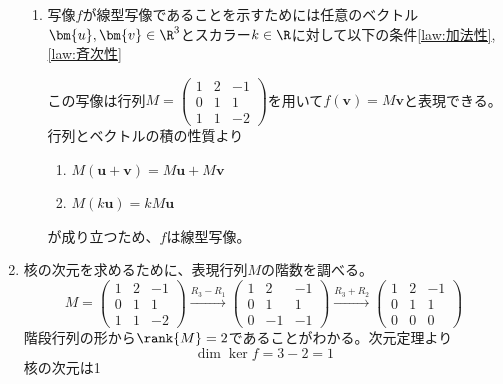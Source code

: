 \documentclass[dvipdfmx]{jsreport}
\begin{document}
\begin{souanswer}
\begin{enumerate}
\begin{enumerate_roman}
\end{enumerate_roman}
\begin{enumerate}
	\item 写像$f$が線型写像であることを示すためには任意のベクトル$\bm{u}, \bm{v}\in \R^3$とスカラー$k\in \R$に対して以下の条件\ref{law:加法性}, \ref{law:斉次性}
	この写像は行列$M= \begin{pmatrix}1& 2& -1\\ 0& 1& 1\\ 1& 1& -2\end{pmatrix}$を用いて$f(\bm{v})= M\bm{v}$と表現できる。行列とベクトルの積の性質より
\begin{enumerate}
	\item $M(\bm{u}+ \bm{v})= M\bm{u}+ M\bm{v}$
	\item $M(k\bm{u})= kM\bm{u}$
\end{enumerate}
	が成り立つため、$f$は線型写像。
\end{enumerate}
	\item 核の次元を求めるために、表現行列$M$の階数を調べる。
\begin{equation*}
	M= \begin{pmatrix}1& 2& -1\\ 0& 1& 1\\ 1& 1& -2\end{pmatrix}
\stackrel{R_3- R_1}{\longrightarrow} \begin{pmatrix}1& 2& -1\\ 0& 1& 1\\ 0& -1& -1\end{pmatrix}\stackrel{R_3+ R_2}{\longrightarrow}
\begin{pmatrix}1& 2& -1\\ 0& 1& 1\\ 0& 0& 0\end{pmatrix}
\end{equation*}
	階段行列の形から$\rank{M}= 2$であることがわかる。次元定理より
\begin{equation*}
	\dim{\ker{f}}= 3- 2= 1
\end{equation*}
	核の次元は1
\end{enumerate}
\end{souanswer}
\end{document}
